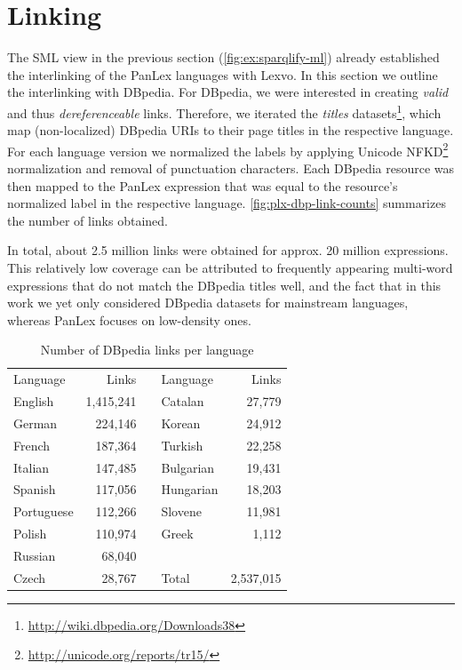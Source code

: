 \documentclass[sw]{iosart2c}
\begin{document}
\section{Linking}
\label{sec:linking}
The SML view in the previous section (\autoref{fig:ex:sparqlify-ml}) already established the interlinking of the PanLex languages with Lexvo.
In this section we outline the interlinking with DBpedia.
For DBpedia, we were interested in creating \emph{valid} and thus \emph{dereferenceable} links.
Therefore, we iterated the \emph{titles} datasets\footnote{\url{http://wiki.dbpedia.org/Downloads38}}, which map (non-localized) DBpedia URIs to their page titles in the respective language.
For each language version we normalized the labels by applying Unicode NFKD\footnote{\url{http://unicode.org/reports/tr15/}} normalization and removal of punctuation characters.
Each DBpedia resource was then mapped to the PanLex expression that was equal to the resource's normalized label in the respective language.
\autoref{fig:plx-dbp-link-counts} summarizes the number of links obtained.

In total, about 2.5 million links were obtained for approx. 20 million expressions.
This relatively low coverage can be attributed to frequently appearing multi-word expressions that do not match the DBpedia titles well, and the fact that in this work we yet only considered DBpedia datasets for mainstream languages, whereas PanLex focuses on low-density ones.

\begin{table}
  \centering\begin{scriptsize}

  \begin{tabular}{lrclr}
    Language   &   Links   && Language  & Links     \\
    \cline{1-2}\cline{4-5}
    English    & 1,415,241 && Catalan   &    27,779 \\
    German     &   224,146 && Korean    &    24,912 \\
    French     &   187,364 && Turkish   &    22,258 \\
    Italian    &   147,485 && Bulgarian &    19,431 \\
    Spanish    &   117,056 && Hungarian &    18,203 \\
    Portuguese &   112,266 && Slovene   &    11,981 \\
    Polish     &   110,974 && Greek     &     1,112 \\
    \cline{4-5}
    Russian    &    68,040 \\
    Czech      &    28,767 && Total     & 2,537,015 \\
  \end{tabular}
  \end{scriptsize}
  \caption{Number of DBpedia links per language}
  \label{fig:plx-dbp-link-counts}
\end{table}
\end{document}
